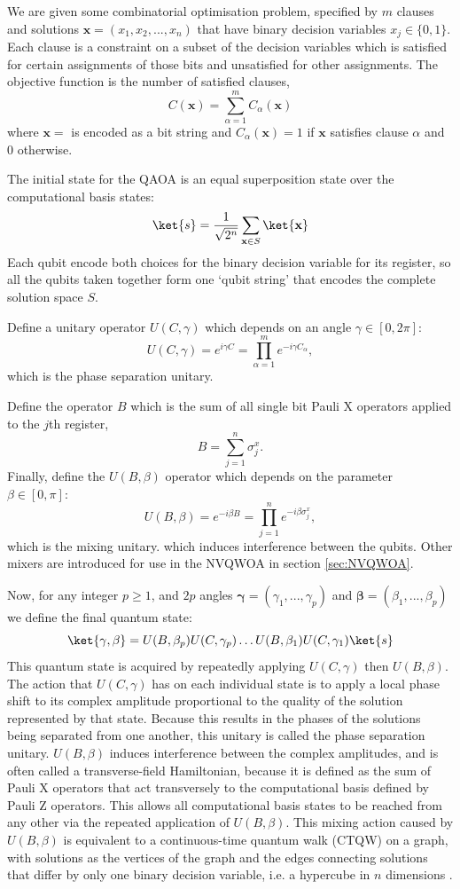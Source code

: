 We are given some combinatorial optimisation problem, specified by $m$ clauses and solutions $\mathbf{x}=(x_1,x_2,...,x_n)$ that have binary decision variables $x_j\in\{0,1\}$. Each clause is a constraint on a subset of the decision variables which is satisfied for certain assignments of those bits and unsatisfied for other assignments. The objective function is the number of satisfied clauses,
$$
C(\mathbf{x})=\sum_{\alpha=1}^m C_\alpha(\mathbf{x})
$$
where $\mathbf{x}=$ is encoded as a bit string and $C_\alpha(\mathbf{x})=1$ if $\mathbf{x}$ satisfies clause $\alpha$ and 0 otherwise. 

The initial state for the QAOA is an equal superposition state over the computational basis states:
$$
\ket{s}=\frac{1}{\sqrt{2^n}}\sum_{\mathbf{x}\in S}\ket{\mathbf{x}}
$$
Each qubit encode both choices for the binary decision variable for its register, so all the qubits taken together form one `qubit string' that encodes the complete solution space $S$.

Define a unitary operator $U(C, \gamma)$ which depends on an angle $\gamma\in[0,2\pi]$:
$$
U(C,\gamma)=e^{i\gamma C}=\prod_{\alpha=1}^m e^{-i\gamma C_\alpha},
$$
which is the phase separation unitary. 

Define the operator $B$ which is the sum of all single bit Pauli X operators applied to the $j$th register,
$$
B=\sum_{j=1}^n \sigma_j^x.
$$
Finally, define the $U(B,\beta)$ operator which depends on the parameter $\beta\in[0,\pi]$:
$$
U(B,\beta)=e^{-i\beta B}=\prod_{j=1}^{n} e^{-i\beta \sigma_j^x},
$$
which is the mixing unitary. which induces interference between the qubits. Other mixers are introduced for use in the NVQWOA in section \ref{sec:NVQWOA}.

Now, for any integer $p\geq1$, and $2p$ angles $\mathbf{\gamma}=(\gamma_1, ...,\gamma_p)$ and $\mathbf{\beta}=(\beta_1, ...,\beta_p)$ we define the final quantum state:
$$
\ket{\mathbf{\gamma},\mathbf{\beta}}=U(B,\beta_p)U(C,\gamma_p)\dots U(B,\beta_1)U(C,\gamma_1) \ket{s}
$$
This quantum state is acquired by repeatedly applying $U(C,\gamma)$ then $U(B,\beta)$. The action that $U(C,\gamma)$ has on each individual state is to apply a local phase shift to its complex amplitude proportional to the quality of the solution represented by that state. Because this results in the phases of the solutions being separated from one another, this unitary is called the phase separation unitary. $U(B,\beta)$ induces interference between the complex amplitudes, and is often called a transverse-field Hamiltonian, because it is defined as the sum of Pauli X operators that act transversely to the computational basis defined by Pauli Z operators. This allows all computational basis states to be reached from any other via the repeated application of $U(B,\beta)$. This mixing action caused by $U(B,\beta)$ is equivalent to a continuous-time quantum walk (CTQW) on a graph, with solutions as the vertices of the graph and the edges connecting solutions that differ by only one binary decision variable, i.e. a hypercube in $n$ dimensions \cite{bennett2024nonvariational}. 

